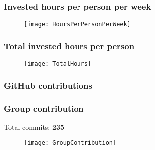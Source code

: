 \subsubsection*{Invested hours per person per week}
\begin{figure}[H]
	\centering
	\texttt{[image: HoursPerPersonPerWeek]}
\end{figure}

\subsubsection*{Total invested hours per person}
\begin{figure}[H]
	\centering
	\texttt{[image: TotalHours]}
\end{figure}

\newpage
\subsubsection{GitHub contributions}
\subsubsection*{Group contribution}
Total commits: \textbf{235}
\begin{figure}[H]
	\centering
	\texttt{[image: GroupContribution]}
\end{figure}

